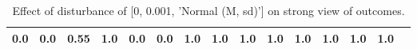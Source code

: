 \begin{table}
\begin{tabular}{l|cc|cc|cc|cc|cc|cc|cc}
\cellcolor{Bittersweet}0.0&\cellcolor{Bittersweet}0.0&0.55&1.0&\cellcolor{Bittersweet}0.0&\cellcolor{Bittersweet}0.0&\cellcolor{Bittersweet}1.0&\cellcolor{Bittersweet}1.0&\cellcolor{Bittersweet}1.0&\cellcolor{Bittersweet}1.0&\cellcolor{Bittersweet}1.0&\cellcolor{Bittersweet}1.0&\cellcolor{Bittersweet}1.0&\cellcolor{Bittersweet}1.0\\\bottomrule\end{tabular}\caption{Effect of disturbance of [0, 0.001, 'Normal (M, sd)'] on strong view of outcomes.}\end{table}